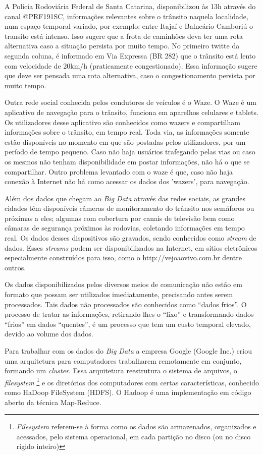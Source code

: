 A Polícia Rodoviária Federal de Santa Catarina, disponibilizou às 13h através do canal @PRF191SC, informações relevantes sobre o trânsito naquela localidade, 
num espaço temporal variado, por exemplo: entre Itajaí e Balneário Camboriú o transito está intenso. Isso sugere que a frota de caminhões deva ter uma
rota alternativa caso a situação persista por muito tempo. No primeiro twitte da segunda coluna, é informado em Via Expressa (BR 282) que o trânsito está lento com 
velocidade de 20km/h (praticamente congestionado). Essa informação sugere que deve ser pensada uma rota alternativa, caso o congestionamento persista por muito tempo.

Outra rede social conhecida pelos condutores de veículos é o Waze. O Waze é um aplicativo de navegação para o trânsito, funciona em aparelhos celulares e tablets. 
Os utilizadores desse aplicativo são conhecidos como wazers e compartilham informações sobre o trânsito, em tempo real. Toda via, as informações somente estão disponíveis 
no momento em que são postadas pelos utilizadores, por um período de tempo pequeno. Caso não haja usuários trafegando pelas vias ou caso os mesmos não tenham disponibilidade 
em postar informações, não há o que se compartilhar.
Outro problema levantado com o waze é que, caso não haja conexão à Internet não há como acessar os dados dos 'wazers', para navegação.

Além dos dados que chegam ao \textit{Big Data} através das redes sociais, as grandes cidades têm disponíveis câmeras de monitoramento do trânsito nos semáforos ou próximas a eles; 
algumas com cobertura por canais de televisão bem como câmaras de segurança próximos às rodovias, coletando informações em tempo real. 
Os dados desses dispositivos são gravados, sendo conhecidos como \textit{stream} de dados. 
Esses \textit{streams} podem ser disponibilizados na Internet, em sítios eletrônicos especialmente construídos para isso, como o http://vejoaovivo.com.br dentre outros.

Os dados disponibilizados pelos diversos meios de comunicação não estão em formato que possam ser utilizados imediatamente, precisando antes serem processados. 
Tais dados não processados são conhecidos como ``dados frios''. O processo de tratar as informações, retirando-lhes o ``lixo'' e transformando dados ``frios'' em dados 
``quentes'', é um processo que tem um custo temporal elevado, devido ao volume dos dados.


Para trabalhar com os dados do \textit{Big Data} a empresa Google (Google Inc.) criou uma arquitetura para computadores trabalharem remotamente em conjunto, formando um 
\textit{cluster}. Essa arquitetura reestrutura o sistema de arquivos, o \textit{filesystem} \footnote{\textit{Filesystem} referem-se à forma como os dados são armazenados, 
organizados e acessados, pelo sistema operacional, em cada partição no disco (ou no disco rígido inteiro)} \cite{Filesystem} e os diretórios dos computadores com certas 
características, conhecido como HaDoop FileSystem (HDFS). 
O Hadoop é uma implementação em código aberto da técnica Map-Reduce.


